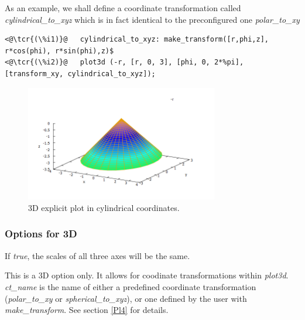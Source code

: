 \documentclass[../Maxima_Workbook.tex]{subfiles}
\begin{document}
\lz As an example, we shall define a coordinate transformation called \emph{cylindrical\_to\_xyz} which is in fact identical to the preconfigured one \emph{polar\_to\_xy}

\lz \begin{lstlisting}
<@\tcr{(\%i1)}@   cylindrical_to_xyz: make_transform([r,phi,z], r*cos(phi), r*sin(phi),z)$
<@\tcr{(\%i2)}@   plot3d (-r, [r, 0, 3], [phi, 0, 2*%pi], [transform_xy, cylindrical_to_xyz]);
\end{lstlisting}
\vspace{-2mm} 

\begin{figure}
	\centering
	\includegraphics[width=0.75\textwidth]{Pl_explicit_plot3d_cylindrical.png}
	\caption{3D explicit plot in cylindrical coordinates.}
	\label{Pl-Fig10}
\end{figure}

\subsubsection{Options for 3D}\label{Pl3}

\lzz {} \qquad {} \hfill {}

\lz If \emph{true}, the scales of all three axes will be the same.

\lzz {} \qquad {} \hfill {}

\lz This is a 3D option only. It allows for coodinate transformations within \emph{plot3d}. \emph{ct\_name} is the name of either a predefined coordinate transformation (\emph{polar\_to\_xy} or \emph{spherical\_to\_xyz}), or one defined by the user with \emph{make\_transform}. See section \ref{Pl4} for details.
\end{document}
